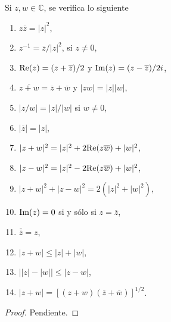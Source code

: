 

\begin{theorem}
Si $z, w \in \mathbb{C}$, se verifica lo siguiente
\begin{multicols}{2}
    \begin{enumerate}[label=\textnormal{(\roman*)}, align=left, labelwidth=2.0em, leftmargin=3.0em]
    \item $z \overline{z} = |z|^2$,
    \item $z^{-1} = \overline{z}/|z|^2$, si $z \ne 0$,
    \item $\textnormal{Re}(z) = (z + \overline{z})/2$ y $\textnormal{Im}(z) = (z - \overline{z}) / 2i$,
    \item $\overline{z + w} = \overline{z} + \overline{w}$ y $|z w| = |z| |w|$,
    \item $|z / w| = |z| / |w|$ si $w \ne 0$,
    \item $|\overline{z}| = |z|$,
    \item $|z + w|^2 = |z|^2 + 2 \textnormal{Re}(z \overline{w}) + |w|^2$,
    \columnbreak
    \item $|z - w|^2 = |z|^2 - 2 \textnormal{Re}(z \overline{w}) + |w|^2$,
    \item $|z + w|^2 + |z - w|^2 = 2(|z|^2 + |w|^2)$,
    \item $\textnormal{Im}(z) = 0$ si y sólo si $z = \overline{z}$,
    \item $\overline{\overline{z}} = z$,
    \item $|z + w| \le |z| + |w|$,
    \item $\big| |z| - |w| \big| \le |z - w|$,
    \item $|z+w| = [(z+w)(\overline{z} + \overline{w})]^{1/2}$.
    \end{enumerate}
\end{multicols}
\end{theorem}

\begin{proof}
Pendiente.
\end{proof}
